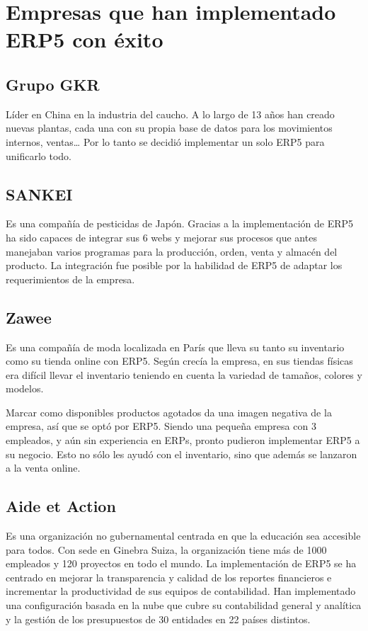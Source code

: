 \chapter{Empresas que han implementado ERP5 con éxito}
\section{Grupo GKR} 
Líder en China en la industria del caucho. A lo largo de 13 años han creado nuevas plantas, cada una con su propia base de datos para los movimientos internos, ventas… Por lo tanto se decidió implementar un solo ERP5 para unificarlo todo.

\section{SANKEI}
Es una compañía de pesticidas de Japón. Gracias a la implementación de ERP5 ha sido capaces de integrar sus 6 webs y mejorar sus procesos que antes manejaban varios programas para la producción, orden, venta y almacén del producto. La integración fue posible por la habilidad de ERP5 de adaptar los requerimientos de la empresa.

\section{Zawee}
Es una compañía de moda localizada en París que lleva su tanto su inventario como su tienda online con ERP5. Según crecía la empresa, en sus tiendas físicas era difícil llevar el inventario teniendo en cuenta la variedad de tamaños, colores y modelos. 

Marcar como disponibles productos agotados da una imagen negativa de la empresa, así que se optó por ERP5. Siendo una pequeña empresa con 3 empleados, y aún sin experiencia en ERPs,  pronto pudieron implementar ERP5 a su negocio. Esto no sólo les ayudó con el inventario, sino que además se lanzaron a la venta online.

\section{Aide et Action}
Es una organización no gubernamental centrada en que la educación sea accesible para todos. Con sede en Ginebra Suiza, la organización tiene más de 1000 empleados y 120 proyectos en todo el mundo. La implementación de ERP5 se ha centrado en mejorar la transparencia y calidad de los reportes financieros e incrementar la productividad de sus equipos de contabilidad. Han implementado una configuración basada en la nube que cubre su contabilidad general y analítica y la gestión de los presupuestos de 30 entidades en 22 países distintos.

